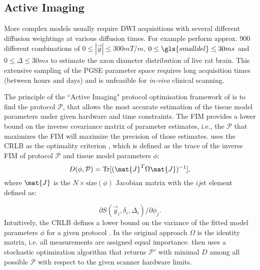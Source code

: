\subsection{Active Imaging}
\label{sec:protocol_optimisation}
More complex models usually require  {\gls{DWI}}  acquisitions with several different diffusion weightings at various diffusion times. For example \citet{Barazany:2009} perform approx. 900 different combinations of $0\le|\vec{g}|\le 300mT/m$, $0\le {\gls{smalldel}} \le 30ms$ and $0\le \Delta \le 30ms$ to estimate the axon diameter distribution of live rat brain. This extensive sampling of the \gls{PGSE} parameter space requires long acquisition times (between hours and days) and is unfeasible for \emph{in-vivo} clinical scanning. 

The principle of the ``Active Imaging" protocol optimisation framework of \cite{Alexander:2008} is to find the protocol $\mathcal{P}$, that allows the most accurate estimation of the tissue model parameters under given hardware and time constraints. The \gls{FIM} provides a lower bound on the inverse covariance matrix of parameter estimates, i.e., the $\mathcal{P}$ that maximizes the \gls{FIM} will maximize the precision of those estimates. \citeauthor{Alexander:2008} uses the \gls{CRLB} as the optimality criterion \citep{OBrien:2003}, which is defined as the trace of the inverse \gls{FIM} of protocol $\mathcal{P}$ and tissue model parameters $\phi$:
\begin{equation}
	D(\phi,\mathcal{P})=\mbox{Tr}[(\mat{J}^T\Omega\mat{J})^{-1}], 
	\label{eq-optimality}
\end{equation}
where $\mat{J}$ is the $N\times \mbox{size}(\phi)$ Jacobian matrix with the $ij$st element defined as:

\begin{equation}
	\partial S(\vec{g}_i,\delta_i,\Delta_i) / \partial \phi_j.
\end{equation}
Intuitively, the \gls{CRLB} defines a lower bound on the variance of the fitted model parameters $\phi$ for a given protocol \prot. In the original approach $\Omega$ is the identity matrix, i.e. all measurements are assigned equal importance. \citet{Alexander:2008} then uses a stochastic optimization algorithm \citep{Zelinka:2010} that returns $\mathcal{P}'$ with minimal $D$ among all possible $\mathcal{P}$ with respect to the given scanner hardware limits.

